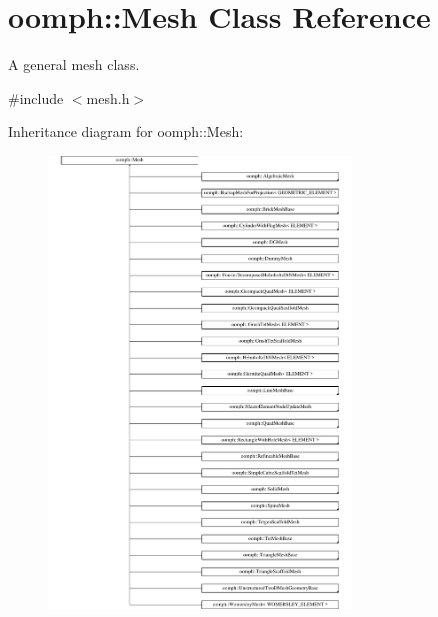 \hypertarget{classoomph_1_1Mesh}{}\section{oomph\+:\+:Mesh Class Reference}
\label{classoomph_1_1Mesh}


A general mesh class.  




{\ttfamily \#include $<$mesh.\+h$>$}

Inheritance diagram for oomph\+:\+:Mesh\+:\begin{figure}[H]
\begin{center}
\leavevmode
\includegraphics[height=12.000000cm]{classoomph_1_1Mesh}
\end{center}
\end{figure}
